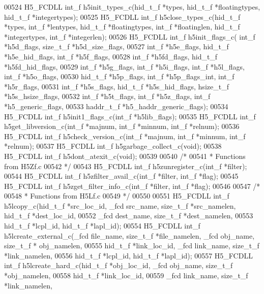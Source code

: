 \begin{DoxyCode}
00524 H5\_FCDLL int\_f h5init\_types\_c(hid\_t\_f *types, hid\_t\_f *floatingtypes, hid\_t\_f *integertypes);
00525 H5\_FCDLL int\_f h5close\_types\_c(hid\_t\_f *types, int\_f *lentypes, hid\_t\_f *floatingtypes, int\_f *floatinglen,
       hid\_t\_f *integertypes, int\_f *integerlen);
00526 H5\_FCDLL int\_f h5init\_flags\_c( int\_f *h5d\_flags, size\_t\_f *h5d\_size\_flags, 
00527         int\_f *h5e\_flags, hid\_t\_f *h5e\_hid\_flags, int\_f *h5f\_flags,
00528                 int\_f *h5fd\_flags, hid\_t\_f *h5fd\_hid\_flags,
00529                 int\_f *h5g\_flags, int\_f *h5i\_flags, int\_f *h5l\_flags, int\_f *h5o\_flags,
00530                 hid\_t\_f *h5p\_flags, int\_f *h5p\_flags\_int, int\_f *h5r\_flags, 
00531                 int\_f *h5s\_flags, hid\_t\_f *h5s\_hid\_flags, hsize\_t\_f *h5s\_hsize\_flags, 
00532         int\_f *h5t\_flags, int\_f *h5z\_flags, int\_f *h5\_generic\_flags,
00533                 haddr\_t\_f *h5\_haddr\_generic\_flags);
00534 H5\_FCDLL int\_f h5init1\_flags\_c(int\_f *h5lib\_flags);
00535 H5\_FCDLL int\_f h5get\_libversion\_c(int\_f *majnum, int\_f *minnum, int\_f *relnum);
00536 H5\_FCDLL int\_f h5check\_version\_c(int\_f *majnum, int\_f *minnum, int\_f *relnum);
00537 H5\_FCDLL int\_f h5garbage\_collect\_c(\textcolor{keywordtype}{void});
00538 H5\_FCDLL int\_f h5dont\_atexit\_c(\textcolor{keywordtype}{void});
00539 
00540 \textcolor{comment}{/*}
00541 \textcolor{comment}{ * Functions from H5Zf.c}
00542 \textcolor{comment}{ */}
00543 H5\_FCDLL int\_f h5zunregister\_c(int\_f *filter);
00544 H5\_FCDLL int\_f h5zfilter\_avail\_c(int\_f *filter, int\_f *flag);
00545 H5\_FCDLL int\_f h5zget\_filter\_info\_c(int\_f *filter, int\_f *flag);
00546 
00547 \textcolor{comment}{/*}
00548 \textcolor{comment}{ * Functions from H5Lf.c}
00549 \textcolor{comment}{ */}
00550 
00551 H5\_FCDLL int\_f h5lcopy\_c(hid\_t\_f *src\_loc\_id, \_fcd src\_name, size\_t\_f *src\_namelen, hid\_t\_f *dest\_loc\_id,
00552               \_fcd dest\_name, size\_t\_f *dest\_namelen,
00553               hid\_t\_f *lcpl\_id, hid\_t\_f *lapl\_id);
00554 H5\_FCDLL int\_f h5lcreate\_external\_c(\_fcd file\_name, size\_t\_f *file\_namelen, \_fcd obj\_name, size\_t\_f *
      obj\_namelen,
00555                      hid\_t\_f *link\_loc\_id, \_fcd link\_name, size\_t\_f *link\_namelen,
00556                      hid\_t\_f *lcpl\_id, hid\_t\_f *lapl\_id);
00557 H5\_FCDLL int\_f h5lcreate\_hard\_c(hid\_t\_f *obj\_loc\_id, \_fcd obj\_name, size\_t\_f *obj\_namelen,
00558                  hid\_t\_f *link\_loc\_id,
00559                  \_fcd link\_name, size\_t\_f *link\_namelen,

\end{DoxyCode}
